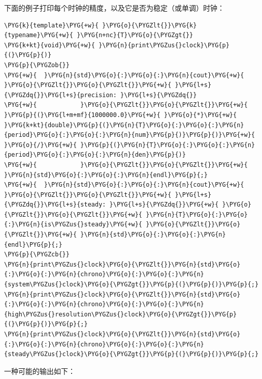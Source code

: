 
下面的例子打印每个时钟的精度，以及它是否为稳定（或单调）时钟：



\begin{codeblockbg}
\begin{Verbatim}[commandchars=\\\{\},breaklines=true,breakanywhere=true,fontsize=\codefont,xleftmargin=17bp]
\PYG{k}{template}\PYG{+w}{ }\PYG{o}{\PYGZlt{}}\PYG{k}{typename}\PYG{+w}{ }\PYG{n+nc}{T}\PYG{o}{\PYGZgt{}}
\PYG{k+kt}{void}\PYG{+w}{ }\PYG{n}{print\PYGZus{}clock}\PYG{p}{(}\PYG{p}{)}
\PYG{p}{\PYGZob{}}
\PYG{+w}{  }\PYG{n}{std}\PYG{o}{:}\PYG{o}{:}\PYG{n}{cout}\PYG{+w}{ }\PYG{o}{\PYGZlt{}}\PYG{o}{\PYGZlt{}}\PYG{+w}{ }\PYG{l+s}{\PYGZdq{}}\PYG{l+s}{precision: }\PYG{l+s}{\PYGZdq{}}
\PYG{+w}{            }\PYG{o}{\PYGZlt{}}\PYG{o}{\PYGZlt{}}\PYG{+w}{ }\PYG{p}{(}\PYG{l+m+mf}{1000000.0}\PYG{+w}{ }\PYG{o}{*}\PYG{+w}{ }\PYG{k+kt}{double}\PYG{p}{(}\PYG{n}{T}\PYG{o}{:}\PYG{o}{:}\PYG{n}{period}\PYG{o}{:}\PYG{o}{:}\PYG{n}{num}\PYG{p}{)}\PYG{p}{)}\PYG{+w}{ }\PYG{o}{/}\PYG{+w}{ }\PYG{p}{(}\PYG{n}{T}\PYG{o}{:}\PYG{o}{:}\PYG{n}{period}\PYG{o}{:}\PYG{o}{:}\PYG{n}{den}\PYG{p}{)}
\PYG{+w}{            }\PYG{o}{\PYGZlt{}}\PYG{o}{\PYGZlt{}}\PYG{+w}{ }\PYG{n}{std}\PYG{o}{:}\PYG{o}{:}\PYG{n}{endl}\PYG{p}{;}
\PYG{+w}{  }\PYG{n}{std}\PYG{o}{:}\PYG{o}{:}\PYG{n}{cout}\PYG{+w}{ }\PYG{o}{\PYGZlt{}}\PYG{o}{\PYGZlt{}}\PYG{+w}{ }\PYG{l+s}{\PYGZdq{}}\PYG{l+s}{steady: }\PYG{l+s}{\PYGZdq{}}\PYG{+w}{ }\PYG{o}{\PYGZlt{}}\PYG{o}{\PYGZlt{}}\PYG{+w}{ }\PYG{n}{T}\PYG{o}{:}\PYG{o}{:}\PYG{n}{is\PYGZus{}steady}\PYG{+w}{ }\PYG{o}{\PYGZlt{}}\PYG{o}{\PYGZlt{}}\PYG{+w}{ }\PYG{n}{std}\PYG{o}{:}\PYG{o}{:}\PYG{n}{endl}\PYG{p}{;}
\PYG{p}{\PYGZcb{}}
\PYG{n}{print\PYGZus{}clock}\PYG{o}{\PYGZlt{}}\PYG{n}{std}\PYG{o}{:}\PYG{o}{:}\PYG{n}{chrono}\PYG{o}{:}\PYG{o}{:}\PYG{n}{system\PYGZus{}clock}\PYG{o}{\PYGZgt{}}\PYG{p}{(}\PYG{p}{)}\PYG{p}{;}
\PYG{n}{print\PYGZus{}clock}\PYG{o}{\PYGZlt{}}\PYG{n}{std}\PYG{o}{:}\PYG{o}{:}\PYG{n}{chrono}\PYG{o}{:}\PYG{o}{:}\PYG{n}{high\PYGZus{}resolution\PYGZus{}clock}\PYG{o}{\PYGZgt{}}\PYG{p}{(}\PYG{p}{)}\PYG{p}{;}
\PYG{n}{print\PYGZus{}clock}\PYG{o}{\PYGZlt{}}\PYG{n}{std}\PYG{o}{:}\PYG{o}{:}\PYG{n}{chrono}\PYG{o}{:}\PYG{o}{:}\PYG{n}{steady\PYGZus{}clock}\PYG{o}{\PYGZgt{}}\PYG{p}{(}\PYG{p}{)}\PYG{p}{;}
\end{Verbatim}
\end{codeblockbg}



一种可能的输出如下：


